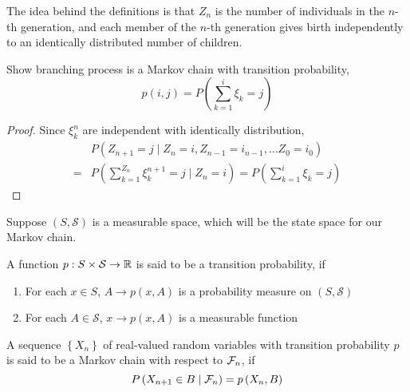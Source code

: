 \begin{remark}
	The idea behind the definitions is that \(Z_{n}\) is the number of individuals in the \(n\)-th generation, and each member of the \(n\)-th generation gives birth independently to an identically distributed number of children.
\end{remark}

\begin{example}
	Show branching process is a Markov chain with transition probability,
	\begin{equation*}
		p(i,j)=P\left(\sum_{k=1}^{i}\xi_{k}=j\right)
	\end{equation*}
\end{example}

\begin{proof}
	Since \(\xi_{k}^{n}\) are independent with identically distribution,
	\begin{equation*}
		\begin{aligned}
			  & P\left(Z_{n+1}=j\mid Z_{n}=i,Z_{n-1}=i_{n-1},\ldots Z_{0}=i_{0}\right)                            \\
			= & P\left(\sum_{k=1}^{Z_{n}}\xi_{k}^{n+1}=j\mid Z_{n}=i\right)=P\left(\sum_{k=1}^{i}\xi_{k}=j\right)
		\end{aligned}
	\end{equation*}
\end{proof}

Suppose \((S, \mathcal{S})\) is a measurable space, which will be the state space for our Markov chain.

\begin{definition}
	A function \(p:S\times\mathcal{S}\rightarrow\mathbb{R}\) is said to be a transition probability, if
	\begin{enumerate}
		\item For each \(x\in S\), \(A\rightarrow p(x,A)\) is a probability measure on \((S,\mathcal{S})\)
		\item For each \(A\in\mathcal{S}\), \(x\rightarrow p(x,A)\) is a measurable function
	\end{enumerate}
\end{definition}
\begin{definition}
	A sequence \(\left\{X_{n}\right\}\) of real-valued random variables with transition probability \(p\) is said to be a Markov chain with respect to \(\mathcal{F}_{n}\), if
	\begin{equation}
		P\left(X_{n+1}\in B\mid\mathcal{F}_{n}\right)=p\left(X_{n},B\right)
	\end{equation}
\end{definition}

